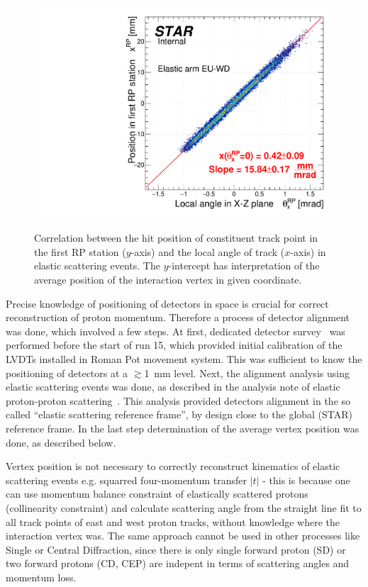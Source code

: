 \begin{figure}[b!]
{  \includegraphics[width=\linewidth,page=4]{graphics/rpSim/VxVy.pdf}
}\vspace{-5pt}%
\caption[Correlation between the hit position of constituent track point in the first RP station and the local angle of track in elastic scattering events.]%
{Correlation between the hit position of constituent track point in the first RP station ($y$-axis) and the local angle of track ($x$-axis) in elastic scattering events. The $y$-intercept has interpretation of the average position of the interaction vertex in given coordinate.}\label{fig:VxVy}%
\end{figure}


Precise knowledge of positioning of detectors in space is crucial for correct reconstruction of proton momentum. Therefore a process of detector alignment was done, which involved a few steps. At first, dedicated detector survey~\cite{surveyNote} was performed before the start of run 15, which provided initial calibration of the LVDTs installed in Roman Pot movement system. This was sufficient to know the positioning of detectors at a $\gtrsim$1~mm level. Next, the alignment analysis using elastic scattering events was done, as described in the analysis note of elastic proton-proton scattering~\cite{ElasticNote}. This analysis provided detectors alignment in the so called ``elastic scattering reference frame'', by design close to the global (STAR) reference frame. In the last step determination of the average vertex position was done, as described below.

Vertex position is not necessary to correctly reconstruct kinematics of elastic scattering events  e.g. squarred four-momentum transfer $|t|$ - this is because one can use momentum balance constraint of elastically scattered protons (collinearity constraint) and calculate scattering angle from the straight line fit to all track points of east and west proton tracks, without knowledge where the interaction vertex was. The same approach cannot be used in other processes like Single or Central Diffraction, since there is only single forward proton (SD) or two forward protons (CD, CEP) are indepent in terms of scattering angles and momentum loss.

